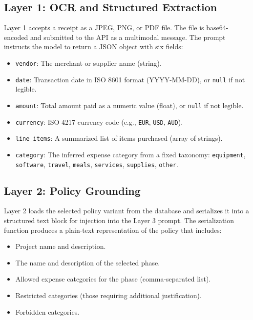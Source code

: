 \documentclass[11pt,a4paper]{article}
\begin{document}
\subsection{Layer 1: OCR and Structured Extraction}
Layer 1 accepts a receipt as a JPEG, PNG, or PDF file. The file is base64-encoded and submitted to the API as a multimodal message. The prompt instructs the model to return a JSON object with six fields:
\begin{itemize}
    \item \texttt{vendor}: The merchant or supplier name (string).
    \item \texttt{date}: Transaction date in ISO 8601 format (YYYY-MM-DD), or \texttt{null} if not legible.
    \item \texttt{amount}: Total amount paid as a numeric value (float), or \texttt{null} if not legible.
    \item \texttt{currency}: ISO 4217 currency code (e.g., \texttt{EUR}, \texttt{USD}, \texttt{AUD}).
    \item \texttt{line\_items}: A summarized list of items purchased (array of strings).
    \item \texttt{category}: The inferred expense category from a fixed taxonomy: \texttt{equipment}, \texttt{software}, \texttt{travel}, \texttt{meals}, \texttt{services}, \texttt{supplies}, \texttt{other}.
\end{itemize}

\subsection{Layer 2: Policy Grounding}
Layer 2 loads the selected policy variant from the database and serializes it into a structured text block for injection into the Layer 3 prompt. The serialization function produces a plain-text representation of the policy that includes:
\begin{itemize}
    \item Project name and description.
    \item The name and description of the selected phase.
    \item Allowed expense categories for the phase (comma-separated list).
    \item Restricted categories (those requiring additional justification).
    \item Forbidden categories.
\end{itemize}
\end{document}
